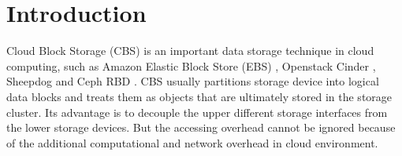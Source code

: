 \documentclass[sigconf, nonacm]{acmart}
\newcommand\vldbdoi{XX.XX/XXX.XX}
\newcommand\vldbpages{XXX-XXX}
\newcommand\vldbvolume{14}
\newcommand\vldbissue{1}
\newcommand\vldbyear{2020}
\newcommand\vldbauthors{\authors}
\newcommand\vldbtitle{\shorttitle}
\newcommand\vldbavailabilityurl{URL_TO_YOUR_ARTIFACTS}
\newcommand\vldbpagestyle{plain}
\begin{document}
%

\section{Introduction}
Cloud Block Storage (CBS) is an important data storage technique in cloud computing, such as Amazon Elastic Block Store (EBS) \cite{varia2014overview}, Openstack Cinder \cite{shrivastwa2016openstack}, Sheepdog \cite{morita2010sheepdog} and Ceph RBD \cite{weil2006ceph,weil2007rados}. CBS usually partitions storage device into logical data blocks and treats them as objects that are ultimately stored in the storage cluster. Its advantage is to decouple the upper different storage interfaces from the lower storage devices. But the accessing overhead cannot be ignored because of the additional computational and network overhead in cloud environment.
\end{document}
